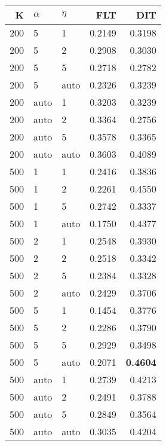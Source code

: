 \begin{table}
\begin{spacing}{1.2}
{\begin{tabular}{rll|rr}
\bottomrule
\end{tabular}
} \hfill \parbox{.45\linewidth}{\centering \begin{tabular}{rll|rr}
\toprule
   K & $\alpha$ &   $\eta$ & FLT &       DIT \\
\midrule
 200 &     5 &     1 &           0.2149 &       0.3198 \\
 200 &     5 &     2 &           0.2908 &       0.3030 \\
 200 &     5 &     5 &           0.2718 &       0.2782 \\
 200 &     5 &  auto &           0.2326 &       0.3239 \\
 200 &  auto &     1 &           0.3203 &       0.3239 \\
 200 &  auto &     2 &           0.3364 &       0.2756 \\
 200 &  auto &     5 &           0.3578 &       0.3365 \\
 200 &  auto &  auto &           0.3603 &       0.4089 \\
 500 &     1 &     1 &           0.2416 &       0.3836 \\
 500 &     1 &     2 &           0.2261 &       0.4550 \\
 500 &     1 &     5 &           0.2742 &       0.3337 \\
 500 &     1 &  auto &           0.1750 &       0.4377 \\
 500 &     2 &     1 &           0.2548 &       0.3930 \\
 500 &     2 &     2 &           0.2518 &       0.3342 \\
 500 &     2 &     5 &           0.2384 &       0.3328 \\
 500 &     2 &  auto &           0.2429 &       0.3706 \\
 500 &     5 &     1 &           0.1454 &       0.3776 \\
 500 &     5 &     2 &           0.2286 &       0.3790 \\
 500 &     5 &     5 &           0.2929 &       0.3498 \\
 500 &     5 &  auto &           0.2071 & {\bf 0.4604} \\
 500 &  auto &     1 &           0.2739 &       0.4213 \\
 500 &  auto &     2 &           0.2491 &       0.3788 \\
 500 &  auto &     5 &           0.2849 &       0.3564 \\
 500 &  auto &  auto &           0.3035 &       0.4204 \\
\bottomrule
\end{tabular}
}
\end{spacing}
\end{table}
